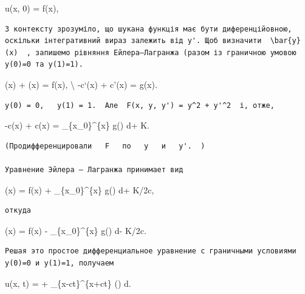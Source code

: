 \documentclass[
  ukrainian,
]{article}
\begin{document}
u(x, 0) = f(x),

\begin{verbatim}
З контексту зрозуміло, що шукана функція має бути диференційовною, оскільки інтегративний вираз залежить від y'. Щоб визначити  \bar{y}(x)  , запишемо рівняння Ейлера–Лагранжа (разом із граничною умовою y(0)=0 та y(1)=1).
\end{verbatim}

\varphi(x) + \psi(x) = f(x), \textbackslash{} -c\varphi`(x) + c\psi'(x)
= g(x).

\begin{verbatim}
y(0) = 0,   y(1) = 1.  Але  F(x, y, y') = y^2 + y'^2  і, отже,
\end{verbatim}

-c\varphi(x) + c\psi(x) = \int\_\{x\_0\}\^{}\{x\} g(\xi) d\xi + K.

\begin{verbatim}
(Продифференцировали   F   по   y   и   y'.  )

Уравнение Эйлера — Лагранжа принимает вид
\end{verbatim}

\psi(x) =  f(x) +  \int\_\{x\_0\}\^{}\{x\} g(\xi)
d\xi + K/2c,

\begin{verbatim}
откуда
\end{verbatim}

\varphi(x) =  f(x) -  \int\_\{x\_0\}\^{}\{x\}
g(\xi) d\xi - K/2c.

\begin{verbatim}
Решая это простое дифференциальное уравнение с граничными условиями y(0)=0 и y(1)=1, получаем
\end{verbatim}

u(x, t) =  \left[ f(x-ct) + f(x+ct) \right] + 
\int\_\{x-ct\}\^{}\{x+ct\} (\xi) d\xi.
\end{document}
